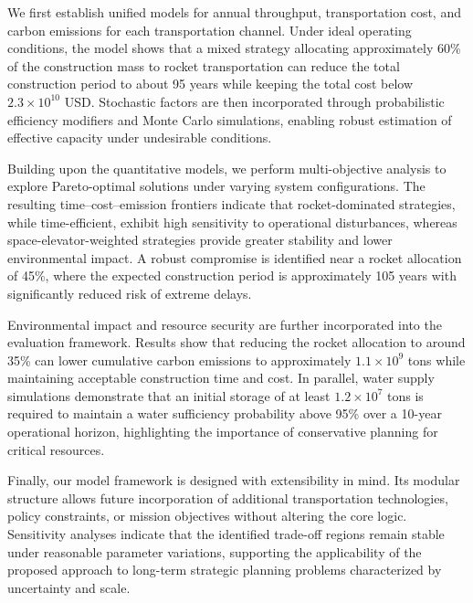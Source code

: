 \documentclass[12pt]{article}
\begin{document}
\vspace{0.5em}

\noindent
We first establish unified models for annual throughput, transportation cost, and carbon emissions for each transportation channel. Under ideal operating conditions, the model shows that a mixed strategy allocating approximately 60\% of the construction mass to rocket transportation can reduce the total construction period to about 95 years while keeping the total cost below $2.3 \times 10^{10}$ USD. Stochastic factors are then incorporated through probabilistic efficiency modifiers and Monte Carlo simulations, enabling robust estimation of effective capacity under undesirable conditions.

\vspace{0.5em}

\noindent
Building upon the quantitative models, we perform multi-objective analysis to explore Pareto-optimal solutions under varying system configurations. The resulting time--cost--emission frontiers indicate that rocket-dominated strategies, while time-efficient, exhibit high sensitivity to operational disturbances, whereas space-elevator-weighted strategies provide greater stability and lower environmental impact. A robust compromise is identified near a rocket allocation of 45\%, where the expected construction period is approximately 105 years with significantly reduced risk of extreme delays.

\vspace{0.5em}

\noindent
Environmental impact and resource security are further incorporated into the evaluation framework. Results show that reducing the rocket allocation to around 35\% can lower cumulative carbon emissions to approximately $1.1 \times 10^{9}$ tons while maintaining acceptable construction time and cost. In parallel, water supply simulations demonstrate that an initial storage of at least $1.2 \times 10^{7}$ tons is required to maintain a water sufficiency probability above 95\% over a 10-year operational horizon, highlighting the importance of conservative planning for critical resources.

\vspace{0.5em}

\noindent
Finally, our model framework is designed with extensibility in mind. Its modular structure allows future incorporation of additional transportation technologies, policy constraints, or mission objectives without altering the core logic. Sensitivity analyses indicate that the identified trade-off regions remain stable under reasonable parameter variations, supporting the applicability of the proposed approach to long-term strategic planning problems characterized by uncertainty and scale.
\end{document}
